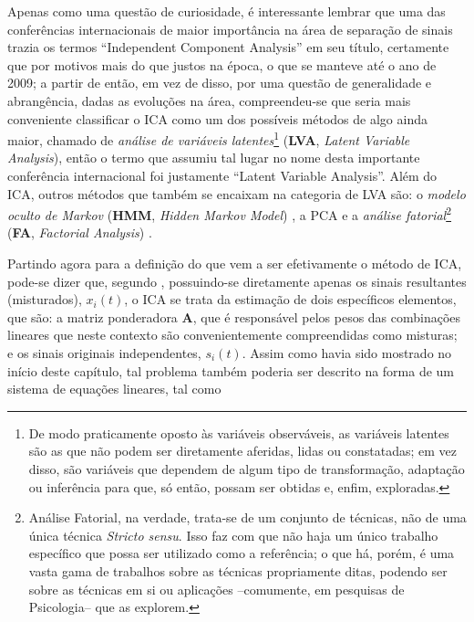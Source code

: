 Apenas como uma questão de curiosidade, é interessante lembrar que uma das conferências internacionais de maior importância na área de separação de sinais trazia os termos ``Independent Component Analysis'' em seu título, certamente que por motivos mais do que justos na época, o que se manteve até o ano de 2009; a partir de então, em vez de disso, por uma questão de generalidade e abrangência, dadas as evoluções na área, compreendeu-se que seria mais conveniente classificar o ICA como um dos possíveis métodos de algo ainda maior, chamado de \textit{análise de variáveis latentes}\footnote{De modo praticamente oposto às variáveis observáveis, as variáveis latentes são as que não podem ser diretamente aferidas, lidas ou constatadas; em vez disso, são variáveis que dependem de algum tipo de transformação, adaptação ou inferência para que, só então, possam ser obtidas e, enfim, exploradas.} (\textbf{LVA}, \textit{Latent Variable Analysis}), então o termo que assumiu tal lugar no nome desta importante conferência internacional foi justamente ``Latent Variable Analysis''. Além do ICA, outros métodos que também se encaixam na categoria de LVA são: o \textit{modelo oculto de Markov} (\textbf{HMM}, \textit{Hidden Markov Model}) \citep{18626}, a PCA e a \textit{análise fatorial}\footnote{Análise Fatorial, na verdade, trata-se de um conjunto de técnicas, não de uma única técnica \textit{Stricto sensu}. Isso faz com que não haja um único trabalho específico que possa ser utilizado como a referência; o que há, porém, é uma vasta gama de trabalhos sobre as técnicas propriamente ditas, podendo ser sobre as técnicas em si ou aplicações --comumente, em pesquisas de Psicologia-- que as explorem.} (\textbf{FA}, \textit{Factorial Analysis}) \citep{vincent1953orgin, c63851e778034799a99dcc4d187768d0, doi:10.1177/001316446002000116}.


Partindo agora para a definição do que vem a ser efetivamente o método de ICA, pode-se dizer que, segundo \citep{hyvarinen2004independent}, possuindo-se diretamente apenas os sinais resultantes (misturados), $x_{i}(t)$, o ICA se trata da estimação de dois específicos elementos, que são: a matriz ponderadora $\mathbf{A}$, que é responsável pelos pesos das combinações lineares que neste contexto são convenientemente compreendidas como misturas; e os sinais originais independentes, $s_{i}(t)$. Assim como havia sido mostrado no início deste capítulo, tal problema também poderia ser descrito na forma de um sistema de equações lineares, tal como

